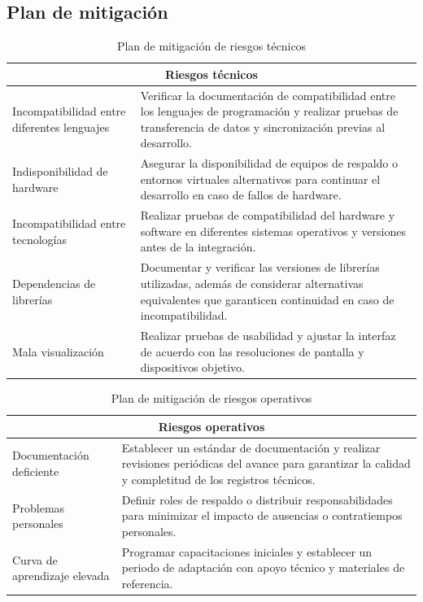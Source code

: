 \subsection{Plan de mitigación}

\begin{table}[H]
	\centering
	\renewcommand{\arraystretch}{1.2}
	\setlength{\tabcolsep}{4pt}
	\begin{tabular}{|p{}|p{}|}
		\hline
		\multicolumn{2}{|c|}{\textbf{Riesgos técnicos}} \\ \hline
		Incompatibilidad entre diferentes lenguajes & Verificar la documentación de compatibilidad entre los lenguajes de programación y realizar pruebas de transferencia de datos y sincronización previas al desarrollo. \\ \hline
		Indisponibilidad de hardware & Asegurar la disponibilidad de equipos de respaldo o entornos virtuales alternativos para continuar el desarrollo en caso de fallos de hardware. \\ \hline
		Incompatibilidad entre tecnologías & Realizar pruebas de compatibilidad del hardware y software en diferentes sistemas operativos y versiones antes de la integración. \\ \hline
		Dependencias de librerías & Documentar y verificar las versiones de librerías utilizadas, además de considerar alternativas equivalentes que garanticen continuidad en caso de incompatibilidad. \\ \hline
		Mala visualización & Realizar pruebas de usabilidad y ajustar la interfaz de acuerdo con las resoluciones de pantalla y dispositivos objetivo. \\ \hline
	\end{tabular}
	\caption{Plan de mitigación de riesgos técnicos}
	\label{table:mitigacion_tecnico}
\end{table}

\begin{table}[H]
	\centering
	\renewcommand{\arraystretch}{1.2}
	\setlength{\tabcolsep}{4pt}
	\begin{tabular}{|p{}|p{}|}
		\hline
		\multicolumn{2}{|c|}{\textbf{Riesgos operativos}} \\ \hline
		Documentación deficiente & Establecer un estándar de documentación y realizar revisiones periódicas del avance para garantizar la calidad y completitud de los registros técnicos. \\ \hline
		Problemas personales & Definir roles de respaldo o distribuir responsabilidades para minimizar el impacto de ausencias o contratiempos personales. \\ \hline
		Curva de aprendizaje elevada & Programar capacitaciones iniciales y establecer un periodo de adaptación con apoyo técnico y materiales de referencia. \\ \hline
	\end{tabular}
	\caption{Plan de mitigación de riesgos operativos}
	\label{table:mitigacion_operativo}
\end{table}

